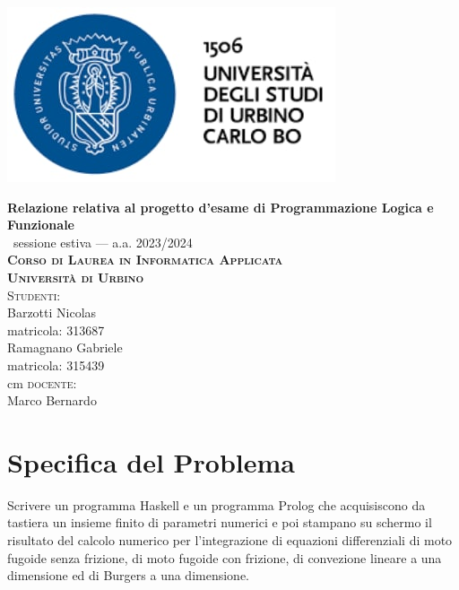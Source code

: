 \documentclass{article}
\begin{document}
\renewcommand\contentsname{Indice}

\begin{titlepage}
	\centering
    \centerline{\includegraphics{Resources/photo5798637185031846732.jpg}}
	\vspace*{\baselineskip}
    \vspace{15\baselineskip}
	\LARGE{\bfseries Relazione relativa al progetto d'esame di Programmazione Logica e Funzionale }\\
	\Large{\ sessione estiva --- a.a. 2023/2024}\\ [0.6cm]
	\large{\textbf{\scshape{Corso di Laurea in Informatica Applicata\\ Università di Urbino}}}\\[3cm]
		{\large {\scshape Studenti:}\\[0.3cm] Barzotti Nicolas\\matricola: 313687\\
        Ramagnano Gabriele\\matricola: 315439}\\
         cm
	     \large{{\scshape docente:} \\[0.3cm] Marco Bernardo}\\[1.3cm]
	
\end{titlepage}

\newpage
\tableofcontents
\newpage

\section{Specifica del Problema}

    Scrivere un programma Haskell e un programma Prolog che acquisiscono da tastiera un insieme finito di parametri numerici e poi stampano su schermo il risultato del calcolo numerico per l’integrazione di equazioni differenziali di moto fugoide senza frizione, di moto fugoide con frizione, di convezione lineare a una dimensione ed di Burgers a una dimensione.
    
\end{document}

